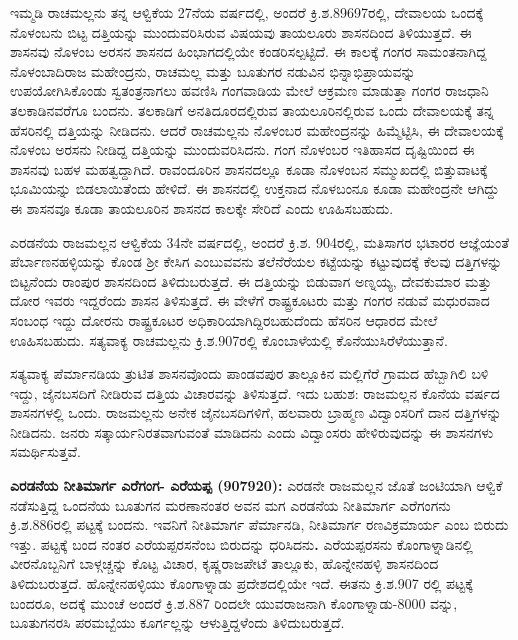 ಇಮ್ಮಡಿ ರಾಚಮಲ್ಲನು ತನ್ನ ಆಳ್ವಿಕೆಯ 27ನೆಯ ವರ್ಷದಲ್ಲಿ, ಅಂದರೆ ಕ್ರಿ.ಶ.896\enginline{-}97ರಲ್ಲಿ, ದೇವಾಲಯ ಒಂದಕ್ಕೆ ನೊಳಂಬನು ಬಿಟ್ಟ ದತ್ತಿಯನ್ನು ಮುಂದುವರಿಸಿರುವ ವಿಷಯವು ತಾಯಲೂರು ಶಾಸನದಿಂದ ತಿಳಿಯುತ್ತದೆ. ಈ ಶಾಸನವು ನೊಳಂಬ ಅರಸನ ಶಾಸನದ ಹಿಂಭಾಗದಲ್ಲಿಯೇ ಕಂಡರಿಸಲ್ಪಟ್ಟಿದೆ. ಈ ಕಾಲಕ್ಕೆ ಗಂಗರ ಸಾಮಂತನಾಗಿದ್ದ ನೊಳಂಬಾದಿರಾಜ ಮಹೇಂದ್ರನು, ರಾಚಮಲ್ಲ ಮತ್ತು ಬೂತುಗರ ನಡುವಿನ ಭಿನ್ನಾಭಿಪ್ರಾಯವನ್ನು ಉಪಯೋಗಿಸಿಕೊಂಡು ಸ್ವತಂತ್ರನಾಗಲು ಹವಣಿಸಿ ಗಂಗವಾಡಿಯ ಮೇಲೆ ಆಕ್ರಮಣ ಮಾಡುತ್ತಾ ಗಂಗರ ರಾಜಧಾನಿ ತಲಕಾಡಿನವರೆಗೂ ಬಂದನು. ತಲಕಾಡಿಗೆ ಅನತಿದೂರದಲ್ಲಿರುವ ತಾಯಲೂರಿನಲ್ಲಿರುವ ಒಂದು ದೇವಾಲಯಕ್ಕೆ ತನ್ನ ಹೆಸರಿನಲ್ಲಿ ದತ್ತಿಯನ್ನು ನೀಡಿದನು. ಆದರೆ ರಾಚಮಲ್ಲನು ನೊಳಂಬರ ಮಹೇಂದ್ರನನ್ನು ಹಿಮ್ಮೆಟ್ಟಿಸಿ, ಈ ದೇವಾಲಯಕ್ಕೆ ನೊಳಂಬ ಅರಸನು ನೀಡಿದ್ದ ದತ್ತಿಯನ್ನು ಮುಂದುವರಿಸಿದನು. ಗಂಗ ನೊಳಂಬರ ಇತಿಹಾಸದ ದೃಷ್ಟಿಯಿಂದ ಈ ಶಾಸನವು ಬಹಳ ಮಹತ್ವದ್ದಾಗಿದೆ. ರಾವಂದೂರಿನ ಶಾಸನದಲ್ಲೂ ಕೂಡಾ ನೊಳಂಬನ ಸಮ್ಮುಖದಲ್ಲಿ ಬಿತ್ತುವಾಟಕ್ಕೆ ಭೂಮಿಯನ್ನು ಬಿಡಲಾಯಿತೆಂದು ಹೇಳಿದೆ. ಈ ಶಾಸನದಲ್ಲಿ ಉಕ್ತನಾದ ನೊಳಬಂನೂ ಕೂಡಾ ಮಹೇಂದ್ರನೇ ಆಗಿದ್ದು ಈ ಶಾಸನವೂ ಕೂಡಾ ತಾಯಲೂರಿನ ಶಾಸನದ ಕಾಲಕ್ಕೇ ಸೇರಿದೆ ಎಂದು ಊಹಿಸಬಹುದು.

ಎರಡನೆಯ ರಾಜಮಲ್ಲನ ಆಳ್ವಿಕೆಯ 34ನೇ ವರ್ಷದಲ್ಲಿ, ಅಂದರೆ ಕ್ರಿ.ಶ. 904ರಲ್ಲಿ, ಮತಿಸಾಗರ ಭಟಾರರ ಆಜ್ಞೆಯಂತೆ ಪೆರ್ಬಾಣನಹಳ್ಳಿಯನ್ನು ಕೊಂಡ ಶ‍್ರೀ ಕೇಸಿಗ ಎಂಬುವವನು ತಲೆನೆರೆಯಲ ಕಟ್ಟೆಯನ್ನು ಕಟ್ಟುವುದಕ್ಕೆ ಕೆಲವು ದತ್ತಿಗಳನ್ನು ಬಿಟ್ಟನೆಂದು ರಾಂಪುರ ಶಾಸನದಿಂದ ತಿಳಿದುಬರುತ್ತದೆ. ಈ ದತ್ತಿಯನ್ನು ಬಿಡುವಾಗ ಅಣ್ನಯ್ಯ, ದೇವಕುಮಾರ ಮತ್ತು ದೋರ ಇವರು ಇದ್ದರೆಂದು ಶಾಸನ ತಿಳಿಸುತ್ತದೆ. ಈ ವೇಳೆಗೆ ರಾಷ್ಟ್ರಕೂಟರು ಮತ್ತು ಗಂಗರ ನಡುವೆ ಮಧುರವಾದ ಸಂಬಂಧ ಇದ್ದು ದೋರನು ರಾಷ್ಟ್ರಕೂಟರ ಅಧಿಕಾರಿಯಾಗಿದ್ದಿರಬಹುದೆಂದು ಹೆಸರಿನ ಆಧಾರದ ಮೇಲೆ ಊಹಿಸಬಹುದು. ಸತ್ಯವಾಕ್ಯ ರಾಚಮಲ್ಲನು ಕ್ರಿ.ಶ.907ರಲ್ಲಿ ಕೊಂಬಾಳೆಯಲ್ಲಿ ಕೊನೆಯುಸಿರೆಳೆಯುತ್ತಾನೆ.

ಸತ್ಯವಾಕ್ಯ ಪೆರ್ಮಾನಡಿಯ ತ್ರುಟಿತ ಶಾಸನವೊಂದು ಪಾಂಡವಪುರ ತಾಲ್ಲೂಕಿನ ಮಲ್ಲಿಗೆರೆ ಗ್ರಾಮದ ಹೆಬ್ಬಾಗಿಲಿ ಬಳಿ ಇದ್ದು, ಜೈನಬಸದಿಗೆ ನೀಡಿರುವ ದತ್ತಿಯ ವಿಚಾರವನ್ನು ತಿಳಿಸುತ್ತದೆ. ಇದು ಬಹುಶ: ರಾಜಮಲ್ಲನ ಕೊನೆಯ ವರ್ಷದ ಶಾಸನಗಳಲ್ಲಿ ಒಂದು. ರಾಜಮಲ್ಲನು ಅನೇಕ ಜೈನಬಸದಿಗಳಿಗೆ, ಹಲವಾರು ಬ್ರಾಹ್ಮಣ ವಿದ್ವಾಂಸರಿಗೆ ದಾನ ದತ್ತಿಗಳನ್ನು ನೀಡಿದನು. ಜನರು ಸತ್ಕಾರ್ಯನಿರತವಾಗುವಂತೆ ಮಾಡಿದನು ಎಂದು ವಿದ್ವಾಂಸರು ಹೇಳಿರುವುದನ್ನು ಈ ಶಾಸನಗಳು ಸಮರ್ಥಿಸುತ್ತವೆ.

\textbf{ಎರಡನೆಯ ನೀತಿಮಾರ್ಗ ಎರೆಗಂಗ- ಎರೆಯಪ್ಪ (907\general{\enginline{-}}920): } ಎರಡನೇ ರಾಜಮಲ್ಲನ ಜೊತೆ ಜಂಟಿಯಾಗಿ ಆಳ್ವಿಕೆ ನಡೆಸುತ್ತಿದ್ದ ಒಂದನೆಯ ಬೂತುಗನ ಮರಣಾನಂತರ ಅವನ ಮಗ ಎರಡನೆಯ ನೀತಿಮಾರ್ಗ ಎರೆಗಂಗನು ಕ್ರಿ.ಶ.886ರಲ್ಲಿ ಪಟ್ಟಕ್ಕೆ ಬಂದನು. ಇವನಿಗೆ ನೀತಿಮಾರ್ಗ ಪೆರ್ಮಾನಡಿ, ನೀತಿಮಾರ್ಗ ರಣವಿಕ್ರಮಾರ್ಯ ಎಂಬ ಬಿರುದು ಇತ್ತು. ಪಟ್ಟಕ್ಕೆ ಬಂದ ನಂತರ ಎರೆಯಪ್ಪರಸನೆಂಬ ಬಿರುದನ್ನು ಧರಿಸಿದನು\textbf{. }ಎರೆಯಪ್ಪರಸನು ಕೊಂಗಾಳ್ನಾಡಿನಲ್ಲಿ ವೀರನೊಬ್ಬನಿಗೆ ಬಾಳ್ಗಚ್ಚನ್ನು ಕೊಟ್ಟ ವಿಚಾರ, ಕೃಷ್ಣರಾಜಪೇಟೆ ತಾಲ್ಲೂಕು, ಹೊನ್ನೇನಹಳ್ಳಿ ಶಾಸನದಿಂದ ತಿಳಿದುಬರುತ್ತದೆ. ಹೊನ್ನೇನಹಳ್ಳಿಯು ಕೊಂಗಾಳ್ನಾಡು ಪ್ರದೇಶದಲ್ಲಿಯೇ ಇದೆ. ಈತನು ಕ್ರಿ.ಶ.907 ರಲ್ಲಿ ಪಟ್ಟಕ್ಕೆ ಬಂದರೂ, ಅದಕ್ಕೆ ಮುಂಚೆ ಅಂದರೆ ಕ್ರಿ.ಶ.887 ರಿಂದಲೇ ಯುವರಾಜನಾಗಿ ಕೊಂಗಾಳ್ನಾಡು-8000 ವನ್ನು, ಬೂತುಗನರಸಿ ಪರಮಬ್ಬೆಯು ಕೂರ್ಗಲ್ಲನ್ನು ಆಳುತ್ತಿದ್ದಳೆಂದು ತಿಳಿದುಬರುತ್ತದೆ.


